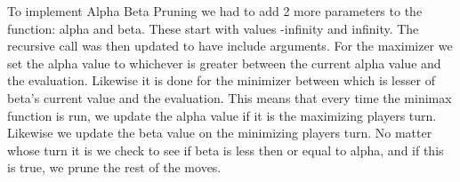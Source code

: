 To implement Alpha Beta Pruning we had to add 2 more parameters to the function: alpha and beta. These start with values -infinity and infinity.
The recursive call was then updated to have include arguments. For the maximizer we set the alpha value to whichever is greater between the current alpha value and the evaluation.
Likewise it is done for the minimizer between which is lesser of beta's current value and the evaluation. This means that every time the minimax function is run, we update the alpha value if it is the maximizing players turn. 
Likewise we update the beta value on the minimizing players turn.
No matter whose turn it is we check to see if beta is less then or equal to alpha, and if this is true, we prune the rest of the moves.
\clearpage